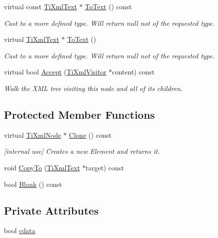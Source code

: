 \begin{DoxyCompactItemize}
\item 
virtual const \hyperlink{class_ti_xml_text}{TiXmlText} $\ast$ \hyperlink{class_ti_xml_text_a895bf34ffad17f7439ab2a52b9651648}{ToText} () const 
\begin{DoxyCompactList}\small\item\em Cast to a more defined type. Will return null not of the requested type. \end{DoxyCompactList}\item 
virtual \hyperlink{class_ti_xml_text}{TiXmlText} $\ast$ \hyperlink{class_ti_xml_text_ae7c3a8fd3e4dbf6c0c4363a943d72f5b}{ToText} ()
\begin{DoxyCompactList}\small\item\em Cast to a more defined type. Will return null not of the requested type. \end{DoxyCompactList}\item 
virtual bool \hyperlink{class_ti_xml_text_a43b9954ebf679557fac1a4453f337b7c}{Accept} (\hyperlink{class_ti_xml_visitor}{TiXmlVisitor} $\ast$content) const 
\begin{DoxyCompactList}\small\item\em Walk the XML tree visiting this node and all of its children. \end{DoxyCompactList}\end{DoxyCompactItemize}
\subsection*{Protected Member Functions}
\begin{DoxyCompactItemize}
\item 
virtual \hyperlink{class_ti_xml_node}{TiXmlNode} $\ast$ \hyperlink{class_ti_xml_text_adde1869dfb029be50713fbfd8ce4d21f}{Clone} () const 
\begin{DoxyCompactList}\small\item\em \mbox{[}internal use\mbox{]} Creates a new Element and returns it. \end{DoxyCompactList}\item 
void \hyperlink{class_ti_xml_text_adcec7d9b6fccfc5777452bb97e6031c1}{CopyTo} (\hyperlink{class_ti_xml_text}{TiXmlText} $\ast$target) const 
\item 
bool \hyperlink{class_ti_xml_text_a1c120428e3b3cf24d79706e6d2b65aa6}{Blank} () const 
\end{DoxyCompactItemize}
\subsection*{Private Attributes}
\begin{DoxyCompactItemize}
\item 
bool \hyperlink{class_ti_xml_text_a1919a0467daf2cf5d099b225add5b9f1}{cdata}
\end{DoxyCompactItemize}
